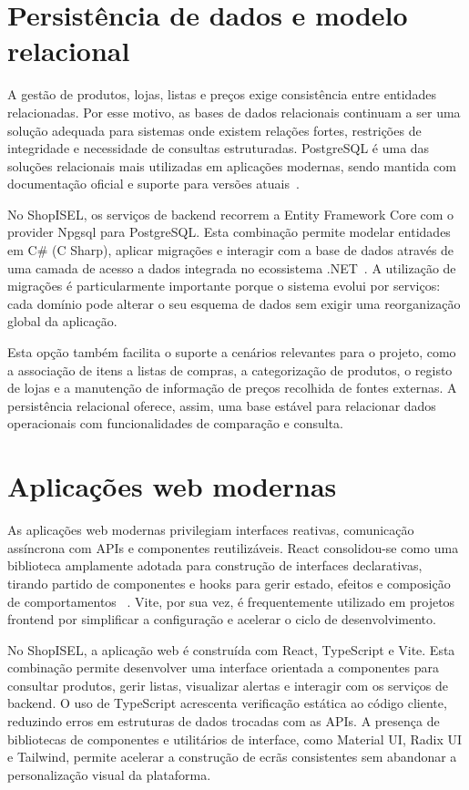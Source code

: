 \section{Persistência de dados e modelo relacional}
\label{sec:2.3}

A gestão de produtos, lojas, listas e preços exige consistência entre entidades
relacionadas. Por esse motivo, as bases de dados relacionais continuam a ser uma
solução adequada para sistemas onde existem relações fortes, restrições de integridade
e necessidade de consultas estruturadas. PostgreSQL é uma das soluções relacionais
mais utilizadas em aplicações modernas, sendo mantida com documentação oficial e
suporte para versões atuais~\cite{postgresql-docs}.

No ShopISEL, os serviços de backend recorrem a Entity Framework Core com o provider
Npgsql para PostgreSQL. Esta combinação permite modelar entidades em C\# (C Sharp),
aplicar migrações e interagir com a base de dados através de uma camada de acesso a
dados integrada no ecossistema .NET~\cite{npgsql-efcore}. A utilização de migrações é 
particularmente importante porque o sistema evolui por serviços: cada domínio pode alterar 
o seu esquema de dados sem exigir uma reorganização global da aplicação.

Esta opção também facilita o suporte a cenários relevantes para o projeto, como a
associação de itens a listas de compras, a categorização de produtos, o registo de
lojas e a manutenção de informação de preços recolhida de fontes externas. A
persistência relacional oferece, assim, uma base estável para relacionar dados
operacionais com funcionalidades de comparação e consulta.

\section{Aplicações web modernas}
\label{sec:2.4}

As aplicações web modernas privilegiam interfaces reativas, comunicação assíncrona
com \ac{API}s e componentes reutilizáveis. React consolidou-se como uma biblioteca
amplamente adotada para construção de interfaces declarativas, tirando partido de
componentes e hooks para gerir estado, efeitos e composição de comportamentos
~\cite{react-hooks}. Vite, por sua vez, é frequentemente utilizado em projetos
frontend por simplificar a configuração e acelerar o ciclo de desenvolvimento.

No ShopISEL, a aplicação web é construída com React, TypeScript e Vite. Esta
combinação permite desenvolver uma interface orientada a componentes para consultar
produtos, gerir listas, visualizar alertas e interagir com os serviços de backend.
O uso de TypeScript acrescenta verificação estática ao código cliente, reduzindo erros
em estruturas de dados trocadas com as \ac{API}s. A presença de bibliotecas de
componentes e utilitários de interface, como Material UI, Radix UI e Tailwind, permite
acelerar a construção de ecrãs consistentes sem abandonar a personalização visual da
plataforma.

